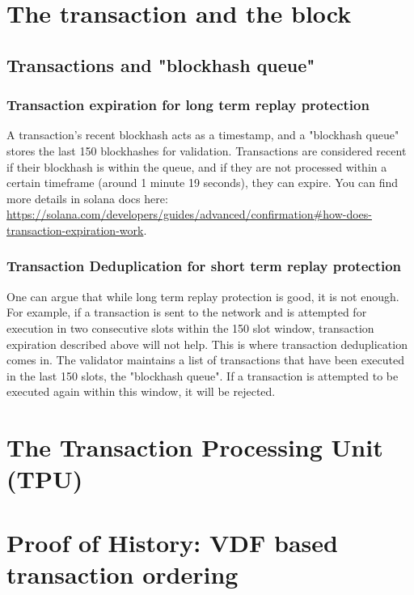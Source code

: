 \section{The transaction and the block}

\subsection{Transactions and "blockhash queue"}

\subsubsection{Transaction expiration for long term replay protection}
A transaction's recent blockhash acts as a timestamp, and a "blockhash queue" stores the last 150 blockhashes for validation. Transactions are considered recent if their blockhash is within the queue, and if they are not processed within a certain timeframe (around 1 minute 19 seconds), they can expire. You can find more details in solana docs here: \href{https://solana.com/developers/guides/advanced/confirmation#how-does-transaction-expiration-work}{https://solana.com/developers/guides/advanced/confirmation\#how-does-transaction-expiration-work}.

\subsubsection{Transaction Deduplication for short term replay protection}
One can argue that while long term replay protection is good, it is not enough. For example, if a transaction is sent to the network and is attempted for execution in two consecutive slots within the 150 slot window, transaction expiration described above will not help. This is where transaction deduplication comes in. The validator maintains a list of transactions that have been executed in the last 150 slots, the "blockhash queue". If a transaction is attempted to be executed again within this window, it will be rejected.


\section{The Transaction Processing Unit (TPU)}
\section{Proof of History: VDF based transaction ordering}
